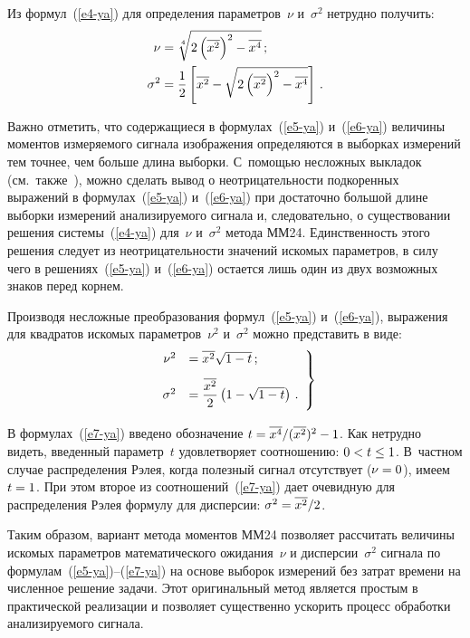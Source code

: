 \begin{multicols}{2}
    Из формул~(\ref{e4-ya}) для определения параметров~$\nu$ и~$\sigma^2$ нетрудно
получить:
    \begin{align}
    \nu &= \sqrt[4]{2\left( \overline{x^2}\right)^2-\overline{x^4}}\,;\label{e5-ya}\\
    \sigma^2 &= \displaystyle\frac{\displaystyle 1\mathstrut}{\displaystyle 2\mathstrut}\left[ \overline{x^2} -\sqrt{2\left( \overline{x^2}\right)^2 -
\overline{x^4}}\right]\,.\label{e6-ya}
    \end{align}

    Важно отметить, что содержащиеся в формулах~(\ref{e5-ya}) и~(\ref{e6-ya})
величины моментов измеряемого сигна\-ла изображения определяются в выборках
измере\-ний тем точнее, чем больше длина выборки. {С~помощью} несложных выкладок
(см.\ также~\cite{15-ya, 17-ya, 18-ya}), можно сделать вывод о неотрицательности
подкоренных выражений в формулах~(\ref{e5-ya}) и~(\ref{e6-ya}) при достаточно
большой длине выборки измерений анализируемого сигнала и, следовательно, о
существовании решения системы~(\ref{e4-ya}) для~$\nu$ и~$\sigma^2$ метода ММ24.
Единственность этого решения следует из неотрицательности значений искомых
па\-ра\-мет\-ров, в силу чего в решениях~(\ref{e5-ya}) и~(\ref{e6-ya}) остается лишь один из
двух возможных знаков перед корнем.

    Производя несложные преобразования формул~(\ref{e5-ya}) и~(\ref{e6-ya}),
выражения для квадратов искомых параметров~$\nu^2$ и~$\sigma^2$ можно представить
в виде:
    \begin{equation}
    \left.
    \begin{array}{rl}
    \nu^2 &= \overline{x^2}\sqrt{1-t}\,;\\[9pt]
    \sigma^2 &= \displaystyle\frac{\displaystyle \overline{x^2}\mathstrut}{\displaystyle 2\mathstrut}\left( 1-\sqrt{1-t}\right)\,.
    \end{array}
    \right\}
    \label{e7-ya}
    \end{equation}
	
     В формулах~(\ref{e7-ya}) введено обозначение
$t\hm=\overline{x^4}/(\overline{x^2})^2 \hm-1$. Как нетрудно видеть, введенный
параметр~$t$ удовлетворяет соотношению: $0\hm<t\hm\leq 1$. В~частном случае
распределения Рэлея, когда полезный сигнал отсутствует ($\nu\hm=0$), имеем $t\hm=1$.
При этом второе из соотношений~(\ref{e7-ya}) дает очевидную для распределения Рэлея
формулу для дисперсии: $\sigma^2 \hm= \overline{x^2}/2$.

    Таким образом, вариант метода моментов ММ24 позволяет рассчитать величины
искомых па\-ра\-мет\-ров математического ожидания~$\nu$ и дисперсии~$\sigma^2$ сигнала
по формулам~(\ref{e5-ya})--(\ref{e7-ya}) на основе выборок измерений без затрат времени
на численное решение задачи. Этот оригинальный метод является простым в
практической реализации и позволяет существенно ускорить процесс обработки
анализируемого сигнала.


\end{multicols}
